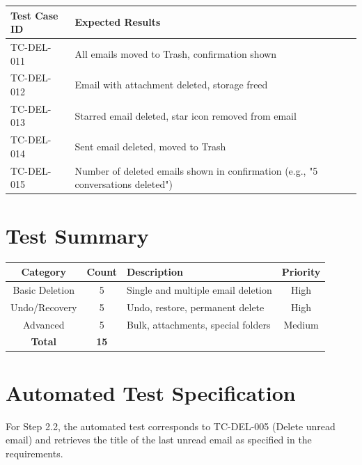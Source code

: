 \documentclass[12pt,a4paper]{article}
\begin{document}
\begin{table}[h!]
\centering
\begin{tabular}{|p{3cm}|p{7cm}|}
\hline
\textbf{Test Case ID} & \textbf{Expected Results} \\
\hline
TC-DEL-011 & All emails moved to Trash, confirmation shown \\
\hline
TC-DEL-012 & Email with attachment deleted, storage freed \\
\hline
TC-DEL-013 & Starred email deleted, star icon removed from email \\
\hline
TC-DEL-014 & Sent email deleted, moved to Trash \\
\hline
TC-DEL-015 & Number of deleted emails shown in confirmation (e.g., "5 conversations deleted") \\
\hline
\end{tabular}
\end{table}

\section{Test Summary}

\begin{table}[h!]
\centering
\begin{tabular}{|c|c|p{4cm}|c|}
\hline
\textbf{Category} & \textbf{Count} & \textbf{Description} & \textbf{Priority} \\
\hline
Basic Deletion & 5 & Single and multiple email deletion & High \\
\hline
Undo/Recovery & 5 & Undo, restore, permanent delete & High \\
\hline
Advanced & 5 & Bulk, attachments, special folders & Medium \\
\hline
\textbf{Total} & \textbf{15} & & \\
\hline
\end{tabular}
\end{table}

\section{Automated Test Specification}

For Step 2.2, the automated test corresponds to TC-DEL-005 (Delete unread email) and retrieves the title of the last unread email as specified in the requirements.
\end{document}
